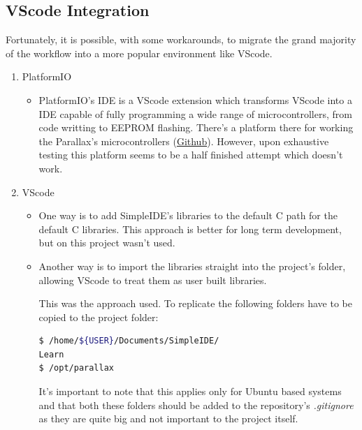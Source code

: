 \documentclass[sigconf,nonacm]{acmart}
\begin{document}
      \subsection{VScode Integration}

      Fortunately, it is possible, with some workarounds, to migrate the grand
      majority of the workflow into a more popular environment like VScode.
      
      \begin{enumerate}
            \item PlatformIO
                  \begin{itemize}
                        \item PlatformIO's IDE is a VScode
                        extension which transforms VScode into a IDE capable of
                        fully programming a wide range of microcontrollers, from
                        code writting to EEPROM flashing. There's a platform
                        there for working the Parallax's
                        microcontrollers (\href{https://github.com/msquirogac/platform-propeller}{Github}).
                        However, upon exhaustive testing this platform seems to
                        be a half finished attempt which doesn't work.
                  \end{itemize}
            \item VScode
                  \begin{itemize}
                        \item One way is to add SimpleIDE's libraries to the
                        default C path for the default C libraries. This
                        approach is better for long term development, but on
                        this project wasn't used.

                        \item Another way is to import the libraries straight
                        into the project's folder, allowing VScode to treat them
                        as user built libraries.
                        
                        This was the approach used. To replicate the following
                        folders have to be copied to the project folder:
                              \begin{lstlisting}[language=bash]
$ /home/${USER}/Documents/SimpleIDE/
Learn
$ /opt/parallax
                                    \end{lstlisting}
                              It's important to note that this applies only for Ubuntu
                                    based systems and that both these folders should be
                                    added to the repository's \textit{.gitignore} as they
                                    are quite big and not important to the project itself.
                  \end{itemize}
      \end{enumerate}
\end{document}

